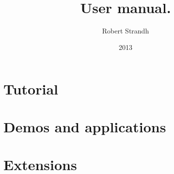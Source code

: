 \documentclass[11pt]{book}
\title{{\Huge \sysname{}}\\
User manual.}
\author{Robert Strandh}
\date{2013}
\def\inputtex#1{}
\begin{document}

\maketitle

\newpage

{\setlength{\parskip}{0cm}
\tableofcontents}

\inputtex{chap-intro.tex}

\part{Tutorial}

\inputtex{chap-first-application.tex}

\inputtex{part-reference.tex}

\part{Demos and applications}

\inputtex{chap-demos-and-applications.tex}

\part{Extensions}

\inputtex{part-spec-issues.tex}

{}


\printindex
\end{document}
